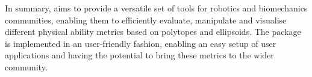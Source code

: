 In summary,  aims to provide a versatile set of tools for robotics and biomechanics communities, enabling them to efficiently evaluate, manipulate and visualise different physical ability metrics based on polytopes and ellipsoids. The package is implemented in an user-friendly fashion, enabling an easy setup of user applications and having the potential to bring these metrics to the wider community. 

